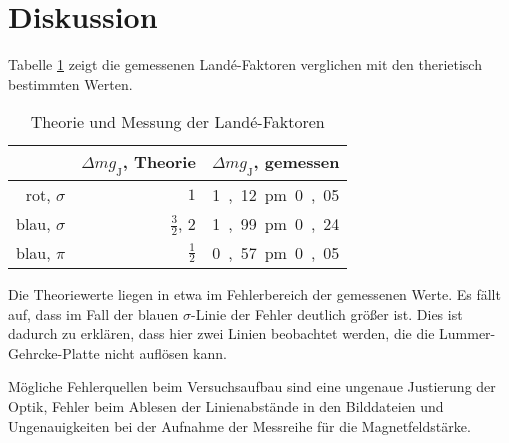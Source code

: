 \section{Diskussion}

Tabelle \ref{tab:theoriemessung} zeigt die gemessenen Landé-Faktoren verglichen mit den therietisch bestimmten Werten.
\begin{table}
	\centering
	\begin{tabular}{r r r}
		\toprule
		& $\Delta m g_\text{J}$, Theorie & $\Delta m g_\text{J}$, gemessen \\
		\midrule	
		rot, $\sigma$ & $1$ & \si{1,12 \pm 0,05} \\
		blau, $\sigma$ & $\frac{3}{2}$, $2$ & \si{1,99 \pm 0,24} \\
		blau, $\pi$ & $\frac{1}{2}$ & \si{0,57 \pm 0,05} \\
		\bottomrule
	\end{tabular}
	\caption{Theorie und Messung der Landé-Faktoren}
	\label{tab:theoriemessung}
\end{table}
Die Theoriewerte liegen in etwa im Fehlerbereich der gemessenen Werte.
Es fällt auf, dass im Fall der blauen $\sigma$-Linie der Fehler deutlich größer ist.
Dies ist  dadurch zu erklären, dass hier zwei Linien beobachtet werden, die die Lummer-Gehrcke-Platte nicht auflösen kann.

Mögliche Fehlerquellen beim Versuchsaufbau sind eine ungenaue Justierung der Optik, Fehler beim Ablesen der Linienabstände in den Bilddateien und Ungenauigkeiten bei der Aufnahme der Messreihe für die Magnetfeldstärke.